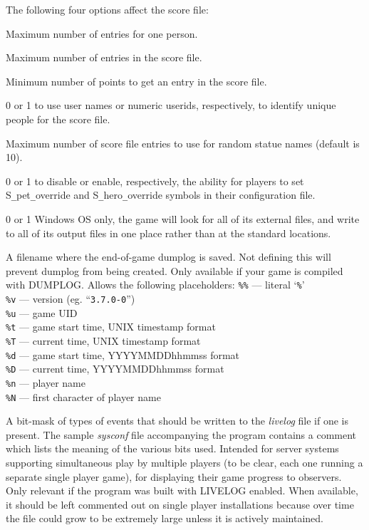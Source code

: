 The following four options affect the score file:
\blist {}
\item[\ib{PERSMAX}]
Maximum number of entries for one person.
\item[\ib{ENTRYMAX}]
Maximum number of entries in the score file.
\item[\ib{POINTSMIN}]
Minimum number of points to get an entry in the score file.
\item[\ib{PERS\verb+_+IS\verb+_+UID}]
0 or 1 to use user names or numeric userids, respectively, to identify
unique people for the score file.
\item[\ib{MAX\verb+_+STATUENAME\verb+_+RANK}]
Maximum number of score file entries to use for
random statue names (default is 10).
\item[\ib{ACCESSIBILITY}]
0 or 1 to disable or enable, respectively, the ability for players
to set S\verb+_+pet\verb+_+override and S\verb+_+hero\verb+_+override 
symbols in their configuration file.
\item[\ib{PORTABLE\verb+_+DEVICE\verb+_+PATHS}]
0 or 1 Windows OS only, the game will look for all of its external
files, and write to all of its output files in one place 
rather than at the standard locations.
\item[\ib{DUMPLOGFILE}]
A filename where the end-of-game dumplog is saved.
Not defining this will prevent dumplog from being created.
Only available if your game is compiled with DUMPLOG.
Allows the following placeholders:
{\tt \%\%}  --- literal `{\tt \%}'\\
{\tt \%v}  --- version (eg. ``{\tt 3.7.0-0}'')\\
{\tt \%u}  --- game UID\\
{\tt \%t}  --- game start time, UNIX timestamp format\\
{\tt \%T}  --- current time, UNIX timestamp format\\
{\tt \%d}  --- game start time, YYYYMMDDhhmmss format\\
{\tt \%D}  --- current time, YYYYMMDDhhmmss format\\
{\tt \%n}  --- player name\\
{\tt \%N}  --- first character of player name
\item[\ib{LIVELOG}]
A bit-mask of types of events that should be written to
the {\it livelog\/} file if one is present.
The sample {\it sysconf\/} file accompanying the program contains a
comment which lists the meaning of the various bits used.
Intended for server systems supporting simultaneous play by multiple
players (to be clear, each one running a separate single player game),
for displaying their game progress to observers.
Only relevant if the program was built with LIVELOG enabled.
When available, it should be left commented out on single player
installations because over time the file could grow to be extremely
large unless it is actively maintained.
\elist

